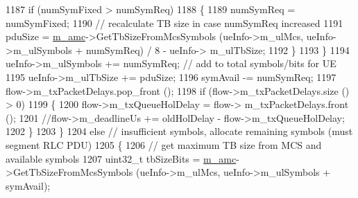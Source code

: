 \begin{DoxyCode}
1187                                                                 \textcolor{keywordflow}{if} (numSymFixed > numSymReq)
1188                                                                 \{
1189                                                                         numSymReq = numSymFixed;
1190                                                                         \textcolor{comment}{// recalculate TB size in case
       numSymReq increased}
1191                                                                         pduSize = 
      \hyperlink{classns3_1_1MmWaveFlexTtiMaxWeightMacScheduler_a36c22ad89fe5d6743a058f253a43a70d}{m\_amc}->GetTbSizeFromMcsSymbols (ueInfo->m\_ulMcs, ueInfo->m\_ulSymbols + numSymReq) / 8 - ueInfo->
      m\_ulTbSize;
1192                                                                 \}
1193                                                         \}
1194                                                         ueInfo->m\_ulSymbols += numSymReq;               \textcolor{comment}{//
       add to total symbols/bits for UE}
1195                                                         ueInfo->m\_ulTbSize += pduSize;
1196                                                         symAvail -= numSymReq;
1197                                                         flow->m\_txPacketDelays.pop\_front ();
1198                                                         \textcolor{keywordflow}{if} (flow->m\_txPacketDelays.size () > 0)
1199                                                         \{
1200                                                                 flow->m\_txQueueHolDelay = flow->
      m\_txPacketDelays.front ();
1201                                                                 \textcolor{comment}{//flow->m\_deadlineUs += oldHolDelay -
       flow->m\_txQueueHolDelay;}
1202                                                         \}
1203                                                 \}
1204                                                 \textcolor{keywordflow}{else}    \textcolor{comment}{// insufficient symbols, allocate remaining symbols
       (must segment RLC PDU)}
1205                                                 \{
1206                                                         \textcolor{comment}{// get maximum TB size from MCS and available
       symbols}
1207                                                         uint32\_t tbSizeBits = 
      \hyperlink{classns3_1_1MmWaveFlexTtiMaxWeightMacScheduler_a36c22ad89fe5d6743a058f253a43a70d}{m\_amc}->GetTbSizeFromMcsSymbols (ueInfo->m\_ulMcs, ueInfo->m\_ulSymbols + symAvail);

\end{DoxyCode}
